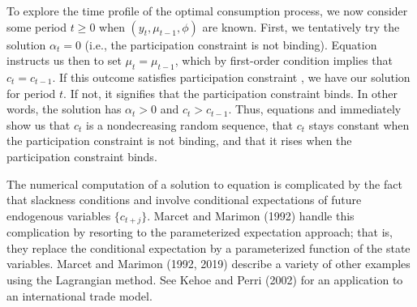 To explore the time profile of the optimal consumption process, we now
consider some period $t\geq 0$ when $(y_t, \mu_{t-1},\phi)$ are known.
 First, we tentatively try the solution $\alpha_t=0$ (i.e., the participation
constraint is not binding).  Equation  instructs us then to
set $\mu_t = \mu_{t-1}$, which by first-order condition 
implies that $c_t = c_{t-1}$. If this outcome satisfies participation
constraint , we have our solution for period $t$. If not,
it signifies that the participation constraint binds. In other words,
the solution has $\alpha_t>0$ and $c_t>c_{t-1}$. Thus,
equations  and  immediately show us that $c_t$
is a nondecreasing random sequence, that $c_t$ stays
constant when the participation constraint is not binding,
and that it rises when the participation constraint binds.

The numerical computation of a solution to equation 
is complicated by the fact that slackness conditions 
and  involve conditional expectations
of future endogenous variables $\{c_{t+j}\}$. Marcet and
Marimon (1992) handle this complication by resorting to the
parameterized expectation approach; that is, they replace
the conditional expectation by a parameterized function of
the state variables.
  Marcet and Marimon (1992, 2019) %
describe a variety of other examples using the Lagrangian method.
See Kehoe and Perri (2002)
%
for an application to an international trade  model.
%
%



